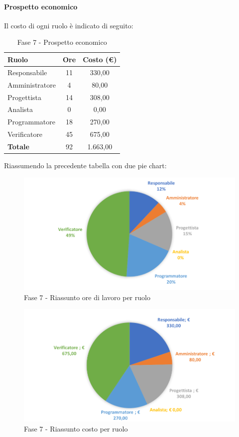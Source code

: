 \documentclass[../PianoDiProgetto.tex]{subfiles}
\begin{document}
			\newpage
			\paragraph{Prospetto economico}
			Il costo di ogni ruolo è indicato di seguito:
			\begin{table}[h]
				\centering
				\begin{tabular}{l * {2}{c}}
				\toprule
				\textbf{Ruolo} & \textbf{Ore} & \textbf{Costo (\euro{})} \\
				\midrule
				Responsabile & 11 & 330,00 \\
				Amministratore & 4 & 80,00 \\
				Progettista & 14 & 308,00 \\
				Analista & 0 & 0,00 \\		
				Programmatore & 18 & 270,00 \\		
				Verificatore & 45 & 675,00 \\				
				\midrule		
				\textbf{Totale} & 92 & 1.663,00 \\
				\bottomrule	
				\end{tabular}
				\caption{Fase 7 - Prospetto economico}		
			\end{table}
			
			Riassumendo la precedente tabella con due pie chart:	
			\begin{figure}[!h]
				\centering
				\includegraphics[width=\textwidth]{Preventivo/Immagini/fase7_oreRuolo.png}
				\caption{Fase 7 - Riassunto ore di lavoro per ruolo}
			\end{figure}	
			\newpage
			\begin{figure}[!h]
				\centering
				\includegraphics[width=\textwidth]{Preventivo/Immagini/fase7_costoRuolo.png}
				\caption{Fase 7 - Riassunto costo per ruolo}
			\end{figure}	
\end{document}
